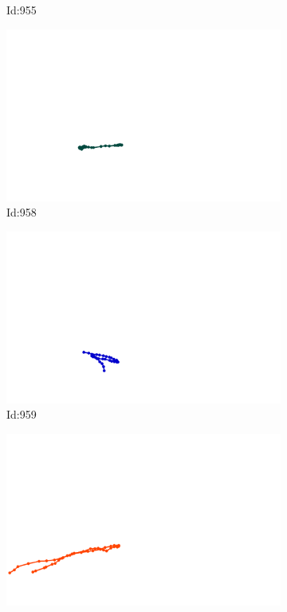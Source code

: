 \documentclass[12pt,twoside]{report}
\begin{document}
\begin{figure}
\begin{subfigure}[b]{0.20\textwidth}
\caption{Id:955}
\end{subfigure}
\begin{subfigure}[b]{0.20\textwidth}
\centering
\includegraphics[width=\textwidth]{../trajectories/958.png}
\caption{Id:958}
\end{subfigure}
\begin{subfigure}[b]{0.20\textwidth}
\centering
\includegraphics[width=\textwidth]{../trajectories/959.png}
\caption{Id:959}
\end{subfigure}
\begin{subfigure}[b]{0.20\textwidth}
\centering
\includegraphics[width=\textwidth]{../trajectories/961.png}

\end{subfigure}
\end{figure}
\end{document}
